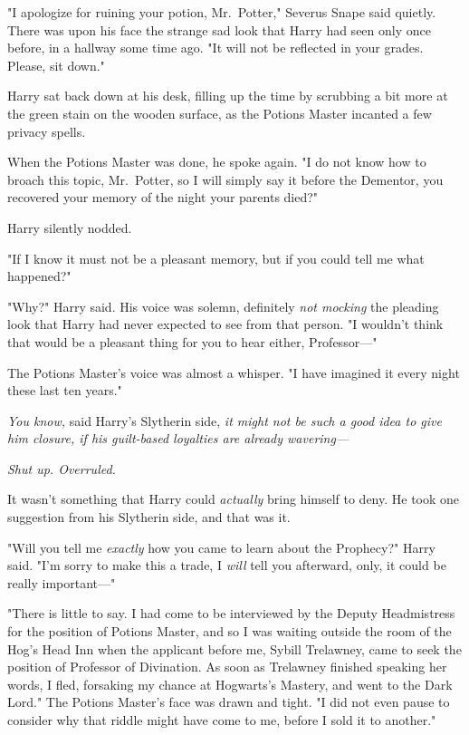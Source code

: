 "I apologize for ruining your potion, Mr.~Potter," Severus Snape said quietly.
There was upon his face the strange sad look that Harry had seen only once
before, in a hallway some time ago. "It will not be reflected in your grades.
Please, sit down."

Harry sat back down at his desk, filling up the time by scrubbing a bit more at
the green stain on the wooden surface, as the Potions Master incanted a few
privacy spells.

When the Potions Master was done, he spoke again. "I{\el} do not know how to
broach this topic, Mr.~Potter, so I will simply say it{\el} before the
Dementor, you recovered your memory of the night your parents died?"

Harry silently nodded.

"If{\el} I know it must not be a pleasant memory, but{\el} if you could
tell me what happened{\el}?"

"Why?" Harry said. His voice was solemn, definitely \emph{not mocking} the
pleading look that Harry had never expected to see from that person. "I
wouldn't think that would be a pleasant thing for you to hear either,
Professor---"

The Potions Master's voice was almost a whisper. "I have imagined it every
night these last ten years."

\emph{You know,} said Harry's Slytherin side, \emph{it might not be such a good
idea to give him closure, if his guilt-based loyalties are already wavering---}

\emph{Shut up. Overruled.}

It wasn't something that Harry could \emph{actually} bring himself to deny. He
took one suggestion from his Slytherin side, and that was it.

"Will you tell me \emph{exactly} how you came to learn about the Prophecy?"
Harry said. "I'm sorry to make this a trade, I \emph{will} tell you afterward,
only, it could be really important---"

"There is little to say. I had come to be interviewed by the Deputy
Headmistress for the position of Potions Master, and so I was waiting outside
the room of the Hog's Head Inn when the applicant before me, Sybill Trelawney,
came to seek the position of Professor of Divination. As soon as Trelawney
finished speaking her words, I fled, forsaking my chance at Hogwarts's Mastery,
and went to the Dark Lord." The Potions Master's face was drawn and tight. "I
did not even pause to consider why that riddle might have come to me, before I
sold it to another."

